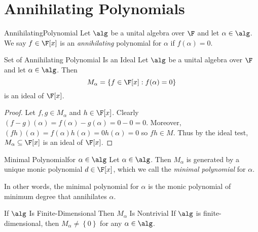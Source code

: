 \documentclass[linearalgebraII]{subfiles}
\begin{document}

    \section{Annihilating Polynomials}

    \begin{definition}{Annihilating}{Polynomial}
        Let $\alg$ be a unital algebra over $\F$ and let $\alpha\in \alg$. We say $f\in \F[x]$ is an \emph{annihilating} polynomial for $\alpha$ if $f(\alpha) = 0$.
    \end{definition}

    \begin{prop}{Set of Annihilating Polynomial Is an Ideal}
        Let $\alg$ be a unital algebra over $\F$ and let $\alpha\in \alg$. Then
        \begin{equation*}
            M_\alpha = \left\lbrace f\in \F[x]: f(\alpha) = 0 \right\rbrace 
        \end{equation*}
        is an ideal of $\F[x]$.
    \end{prop}

    \begin{proof}
        Let $f,g\in M_\alpha$ and $h\in \F[x]$. Clearly $(f-g)(\alpha) = f(\alpha)-g(\alpha) = 0 - 0 = 0$. Moreover, $(fh)(\alpha) = f(\alpha)h(\alpha) = 0h(\alpha) = 0$ so $fh\in M$. Thus by the ideal test, $M_\alpha\subseteq\F[x]$ is an ideal of $\F[x]$.
    \end{proof}

    \begin{definition}{Minimal Polynomial}{for $\alpha\in\alg$}
        Let $\alpha\in\alg$. Then $M_\alpha$ is generated by a unique monic polynomial $d\in \F[x]$, which we call the \emph{minimal polynomial} for $\alpha$. 
    \end{definition}

    \begin{remark}
        In other words, the minimal polynomial for $\alpha$ is the monic polynomial of minimum degree that annihilates $\alpha$.
    \end{remark}

    \begin{prop}{If $\alg$ Is Finite-Dimensional Then $M_\alpha$ Is Nontrivial}
        If $\alg$ is finite-dimensional, then $M_\alpha\neq \left\lbrace 0 \right\rbrace$ for any $\alpha\in\alg$.
    \end{prop}
\end{document}
